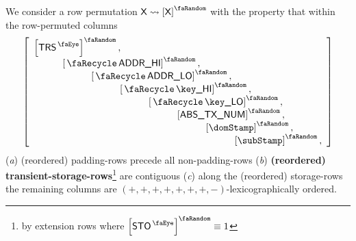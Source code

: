 We consider a row permutation $\col{X}\rightsquigarrow\order{\col{X}}$ with the property that within the row-permuted columns
\[
	\left[ \begin{array}{l}
		\order{\peekTransient}, \\
		\quad\quad\quad \order{\transAddressHi}, \\
		\quad\quad\quad \quad\quad\quad \order{\transAddressLo}, \\
		\quad\quad\quad \quad\quad\quad \quad\quad\quad \order{\transKeyHi}, \\
		\quad\quad\quad \quad\quad\quad \quad\quad\quad \quad\quad\quad \order{\transKeyLo}, \\
		\quad\quad\quad \quad\quad\quad \quad\quad\quad \quad\quad\quad \quad\quad\quad \order{\absTxNum}, \\
		\quad\quad\quad \quad\quad\quad \quad\quad\quad \quad\quad\quad \quad\quad\quad \quad\quad\quad \order{\domStamp}, \\
		\quad\quad\quad \quad\quad\quad \quad\quad\quad \quad\quad\quad \quad\quad\quad \quad\quad\quad \quad\quad\quad \order{\subStamp}, \\
	\end{array} \right]
\]
\noindent
(\emph{a}) (reordered) padding-rows precede all non-padding-rows
(\emph{b}) \textbf{(reordered) transient-storage-rows}\footnote{by extension rows where $\order{\peekStorage} \equiv 1$} are contiguous
(\emph{c}) along the (reordered) storage-rows the remaining columns are $(+, +, +, +, +, +, +, -)$-lexicographically ordered.
